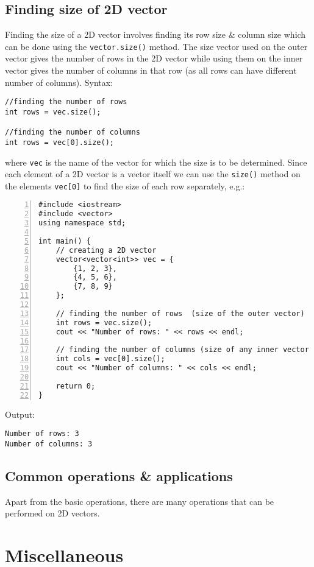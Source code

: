 \documentclass{article}
\begin{document}

\subsection{Finding size of 2D vector}
Finding the size of a 2D vector involves finding its row size \& column size which can be done using the {\tt vector.size()} method. The size vector used on the outer vector gives the number of rows in the 2D vector while using them on the inner vector gives the number of columns in that row (as all rows can have different number of columns). Syntax:
\begin{verbatim}
//finding the number of rows
int rows = vec.size();

//finding the number of columns
int rows = vec[0].size();
\end{verbatim}
where {\tt vec} is the name of the vector for which the size is to be determined. Since each element of a 2D vector is a vector itself we can use the {\tt size()} method on the elements {\tt vec[0]} to find the size of each row separately, e.g.:
\begin{Verbatim}[numbers=left,xleftmargin=5mm]
#include <iostream>
#include <vector>
using namespace std;

int main() {
    // creating a 2D vector
    vector<vector<int>> vec = {
        {1, 2, 3},
        {4, 5, 6},
        {7, 8, 9}
    };
	
    // finding the number of rows  (size of the outer vector)
    int rows = vec.size();
    cout << "Number of rows: " << rows << endl;
	
    // finding the number of columns (size of any inner vector first row)
    int cols = vec[0].size();
    cout << "Number of columns: " << cols << endl;
	
    return 0;
}
\end{Verbatim}
Output:
\begin{verbatim}
Number of rows: 3
Number of columns: 3
\end{verbatim}


\subsection{Common operations \& applications}
Apart from the basic operations, there are many operations that can be performed on 2D vectors.


\section{Miscellaneous}


\printbibliography[heading=bibintoc]
	
\end{document}
